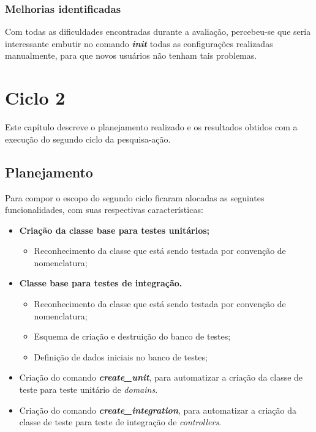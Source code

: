       
      \subsection{Melhorias identificadas}
	  Com todas as dificuldades encontradas durante a avaliação, percebeu-se que seria interessante embutir no comando 
	  \textit{\textbf{init}} todas as configurações realizadas manualmente, para que novos usuários não tenham tais problemas.
    

\chapter{Ciclo 2}

  Este capítulo descreve o planejamento realizado e os resultados obtidos com a execução do segundo ciclo da pesquisa-ação.
  
  \section{Planejamento}
  
    Para compor o escopo do segundo ciclo ficaram alocadas as seguintes funcionalidades, com suas respectivas características:
    
      
    \begin{itemize}
      
        \item \textbf{Criação da classe base para testes unitários;}
    
            \begin{itemize}
              \item Reconhecimento da classe que está sendo testada por convenção de nomenclatura;

            \end{itemize}
     
        \item \textbf{Classe base para testes de integração.}
    
            \begin{itemize}
              \item Reconhecimento da classe que está sendo testada por convenção de nomenclatura;
              \item Esquema de criação e destruição do banco de testes;
              \item Definição de dados iniciais no banco de testes;
            
            \end{itemize}
    
        \item Criação do comando \textit{\textbf{create\_unit}}, para automatizar a criação da classe de teste para teste unitário de \textit{domains}.
        
        \item Criação do comando \textit{\textbf{create\_integration}}, para automatizar a criação da classe de teste para teste de integração de \textit{controllers}.
    
    \end{itemize}

